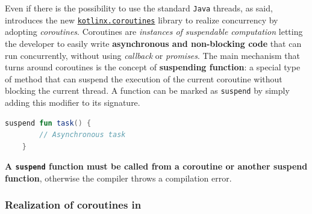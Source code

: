 Even if there is the possibility to use the standard \texttt{Java} threads, as said, \Kotlin introduces the new \href{https://github.com/Kotlin/kotlinx.coroutines}{\texttt{kotlinx.coroutines}} library to realize concurrency by adopting \textit{coroutines}. Coroutines are \textit{instances of suspendable computation} letting the developer to easily write \textbf{asynchronous and non-blocking code} that can run concurrently, without using \textit{callback} or \textit{promises}.
The main mechanism that turns around \Kotlin coroutines is the concept of \textbf{suspending function}: a special type of \Kotlin method that can suspend the execution of the current coroutine without blocking the current thread. A function can be marked as \texttt{suspend} by simply  adding this modifier to its signature.

\begin{lstlisting}[language=kotlin,caption={The first \textit{suspend} function}]
	suspend fun task() {
		// Asynchronous task
	}
\end{lstlisting}

\textbf{A \texttt{suspend} function must be called from a coroutine or another suspend function}, otherwise the compiler throws a compilation error.

\subsubsection{Realization of coroutines in \Kotlin}

